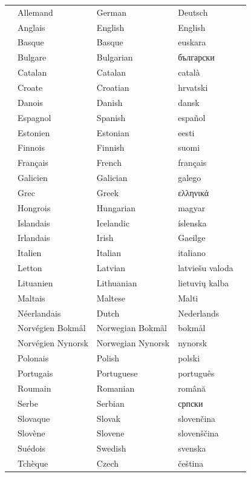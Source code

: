 \documentclass[]{../metanetpaper}
\begin{document}
\vspace*{-5mm}
\centering
  \setlength{\tabcolsep}{2em}
  \begin{tabularx}{\textwidth}{lllll} \toprule\addlinespace
  &Allemand & German & Deutsch& \\
  &Anglais & English & English& \\
  &Basque & Basque & euskara& \\
  &Bulgare & Bulgarian & български& \\
  &Catalan & Catalan & català& \\
  &Croate & Croatian & hrvatski& \\
  &Danois & Danish & dansk& \\
  &Espagnol & Spanish & español& \\
  &Estonien & Estonian & eesti& \\
  &Finnois & Finnish & suomi& \\
  &Français & French & français& \\
  &Galicien & Galician & galego& \\
  &Grec & Greek & ελληνικά& \\
  &Hongrois & Hungarian & magyar& \\ \addlinespace \bottomrule
  &Islandais & Icelandic & íslenska& \\
  &Irlandais & Irish & Gaeilge& \\
  &Italien & Italian & italiano& \\
  &Letton & Latvian & latviešu valoda& \\
  &Lituanien & Lithuanian & lietuvių kalba& \\
  &Maltais & Maltese & Malti& \\
  &Néerlandais & Dutch & Nederlands& \\
  &Norvégien Bokmål & Norwegian Bokmål & bokmål& \\
  &Norvégien Nynorsk & Norwegian Nynorsk & nynorsk& \\
  &Polonais & Polish & polski& \\
  &Portugais & Portuguese & português& \\
  &Roumain & Romanian & română& \\
  &Serbe & Serbian & српски& \\
  &Slovaque & Slovak & slovenčina& \\
  &Slovène & Slovene & slovenščina& \\
  &Suédois & Swedish & svenska& \\
  &Tchèque & Czech & čeština& \\
\end{tabularx}
\end{document}
